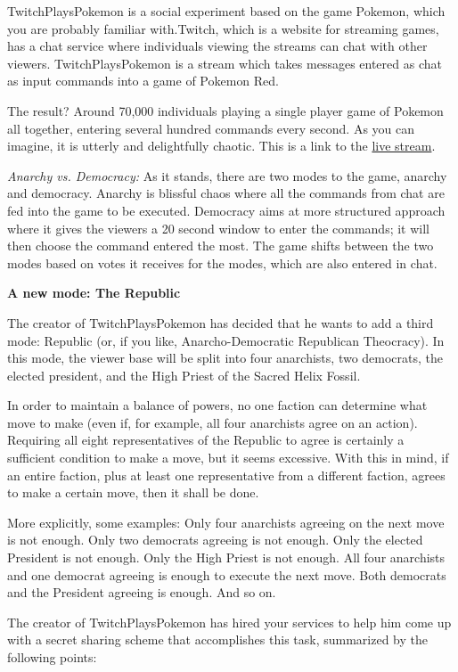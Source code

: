 \documentclass[]{article}
\begin{document}
\begin{qunlist}
TwitchPlaysPokemon is a social experiment based on the game Pokemon, which you are probably familiar with.Twitch, which is a website for streaming games, has a chat service where individuals viewing the streams can chat with other viewers. TwitchPlaysPokemon is a stream which takes messages entered as chat as input commands into a game of Pokemon Red.

The result? Around 70,000 individuals playing a single player game of Pokemon all together, entering several hundred commands every second. As you can imagine, it is utterly and delightfully chaotic. This is a link to the \href{http://www.twitch.tv/twitchplayspokemon}{live stream}.

\textit{Anarchy vs. Democracy:}
As it stands, there are two modes to the game, anarchy and democracy. Anarchy is blissful chaos where all the commands from chat are fed into the game to be executed. Democracy aims at more structured approach where it gives the viewers a 20 second window to enter the commands; it will then choose the command entered the most. The game shifts between the two modes based on votes it receives for the modes, which are also entered in chat.


\textbf{A new mode: The Republic}

The creator of TwitchPlaysPokemon has decided that he wants to add a third mode: Republic (or, if you like, Anarcho-Democratic Republican Theocracy). In this mode, the viewer base will be split into four anarchists, two democrats, the elected president, and the High Priest of the Sacred Helix Fossil. 

In order to maintain a balance of powers, no one faction can determine what move to make (even if, for example, all four anarchists agree on an action). Requiring all eight representatives of the Republic to agree is certainly a sufficient condition to make a move, but it seems excessive. With this in mind, if an entire faction, plus at least one representative from a different faction, agrees to make a certain move, then it shall be done.

More explicitly, some examples: 
Only four anarchists agreeing on the next move is not enough. 
Only two democrats agreeing is not enough. 
Only the elected President is not enough. 
Only the High Priest is not enough. 
All four anarchists and one democrat agreeing is enough to execute the next move.
Both democrats and the President agreeing is enough.
And so on.

The creator of TwitchPlaysPokemon has hired your services to help him come up with a secret sharing scheme that accomplishes this task, summarized by the following points:


\end{qunlist}
\end{document}
